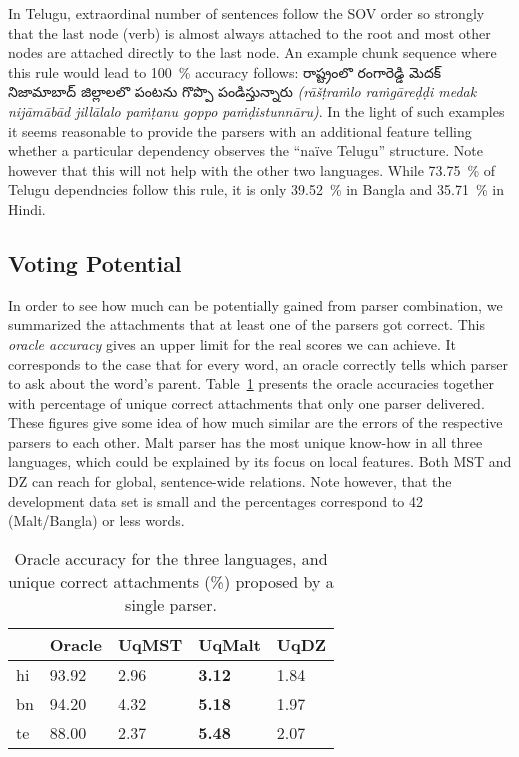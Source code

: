 \documentclass[11pt]{article}
\newcommand{\te}[1]{{\tefont #1}}
\newcommand{\translit}[1]{{\translitfont \textit{(#1)}}}
\def\Tref#1{Table~\ref{#1}}
\begin{document}
In Telugu, extraordinal number of sentences follow the SOV order so strongly that the last node (verb) is almost always attached to the root and most other nodes are attached directly to the last node. An example chunk sequence where this rule would lead to 100~\% accuracy follows: \te{రాష్ట్రంలొ రంగారెడ్డి మెదక్ నిజామాబాద్ జిల్లాలలొ పంటను గొప్పొ పండిస్తున్నారు} \translit{rāšṭraṁlo raṁgāreḍḍi medak nijāmābād jillālalo paṁṭanu goppo paṁḍistunnāru}. In the light of such examples it seems reasonable to provide the parsers with an additional feature telling whether a particular dependency observes the ``naïve Telugu'' structure. Note however that this will not help with the other two languages. While 73.75~\% of Telugu dependncies follow this rule, it is only 39.52~\% in Bangla and 35.71~\% in Hindi.

\subsection{Voting Potential}
\label{sec:votingpotential}

In order to see how much can be potentially gained from parser combination, we summarized the attachments that at least one of the parsers got correct. This \textit{oracle accuracy} gives an upper limit for the real scores we can achieve. It corresponds to the case that for every word, an oracle correctly tells which parser to ask about the word's parent. \Tref{tab:oracle} presents the oracle accuracies together with percentage of unique correct attachments that only one parser delivered. These figures give some idea of how much similar are the errors of the respective parsers to each other. Malt parser has the most unique know-how in all three languages, which could be explained by its focus on local features. Both MST and DZ can reach for global, sentence-wide relations. Note however, that the development data set is small and the percentages correspond to 42 (Malt/Bangla) or less words.

\begin{table}[ht]
\begin{centering}
\begin{tabular}{l|l|l|l|l}
& \textbf{Oracle} & \textbf{UqMST} & \textbf{UqMalt} & \textbf{UqDZ} \\
\hline
hi & 93.92 & 2.96 & \textbf{3.12} & 1.84\\
bn & 94.20 & 4.32 & \textbf{5.18} & 1.97\\
te & 88.00 & 2.37 & \textbf{5.48} & 2.07\\
\end{tabular}
\caption{Oracle accuracy for the three languages, and unique correct attachments (\%) proposed by a single parser.}
\label{tab:oracle}
\end{centering}
\end{table}
\end{document}
